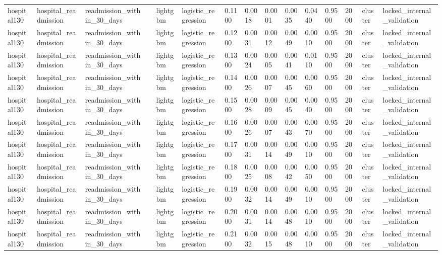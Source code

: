 \begin{tabular}{lllllllllllllll}
hospital130 & hospital\_readmission & readmission\_within\_30\_days &  & lightgbm & logistic\_regression & 0.1100 & 0.0018 & 0.0001 & 0.0035 & 0.0440 & 0.9500 & 2000 & cluster & locked\_internal\_validation \\
hospital130 & hospital\_readmission & readmission\_within\_30\_days &  & lightgbm & logistic\_regression & 0.1200 & 0.0031 & 0.0012 & 0.0049 & 0.0010 & 0.9500 & 2000 & cluster & locked\_internal\_validation \\
hospital130 & hospital\_readmission & readmission\_within\_30\_days &  & lightgbm & logistic\_regression & 0.1300 & 0.0024 & 0.0005 & 0.0041 & 0.0110 & 0.9500 & 2000 & cluster & locked\_internal\_validation \\
hospital130 & hospital\_readmission & readmission\_within\_30\_days &  & lightgbm & logistic\_regression & 0.1400 & 0.0026 & 0.0007 & 0.0045 & 0.0060 & 0.9500 & 2000 & cluster & locked\_internal\_validation \\
hospital130 & hospital\_readmission & readmission\_within\_30\_days &  & lightgbm & logistic\_regression & 0.1500 & 0.0028 & 0.0009 & 0.0045 & 0.0040 & 0.9500 & 2000 & cluster & locked\_internal\_validation \\
hospital130 & hospital\_readmission & readmission\_within\_30\_days &  & lightgbm & logistic\_regression & 0.1600 & 0.0026 & 0.0007 & 0.0043 & 0.0070 & 0.9500 & 2000 & cluster & locked\_internal\_validation \\
hospital130 & hospital\_readmission & readmission\_within\_30\_days &  & lightgbm & logistic\_regression & 0.1700 & 0.0031 & 0.0014 & 0.0049 & 0.0010 & 0.9500 & 2000 & cluster & locked\_internal\_validation \\
hospital130 & hospital\_readmission & readmission\_within\_30\_days &  & lightgbm & logistic\_regression & 0.1800 & 0.0025 & 0.0008 & 0.0042 & 0.0050 & 0.9500 & 2000 & cluster & locked\_internal\_validation \\
hospital130 & hospital\_readmission & readmission\_within\_30\_days &  & lightgbm & logistic\_regression & 0.1900 & 0.0032 & 0.0014 & 0.0049 & 0.0010 & 0.9500 & 2000 & cluster & locked\_internal\_validation \\
hospital130 & hospital\_readmission & readmission\_within\_30\_days &  & lightgbm & logistic\_regression & 0.2000 & 0.0031 & 0.0014 & 0.0048 & 0.0010 & 0.9500 & 2000 & cluster & locked\_internal\_validation \\
hospital130 & hospital\_readmission & readmission\_within\_30\_days &  & lightgbm & logistic\_regression & 0.2100 & 0.0032 & 0.0015 & 0.0048 & 0.0010 & 0.9500 & 2000 & cluster & locked\_internal\_validation \\

\end{tabular}
